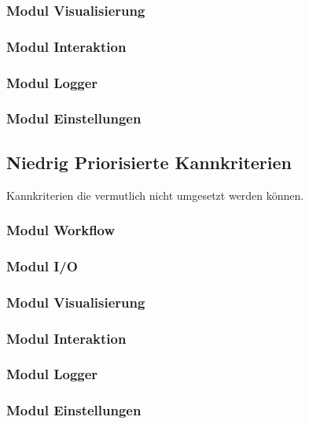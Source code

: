 \subsubsection{Modul Visualisierung}
\subsubsection{Modul Interaktion}
\subsubsection{Modul Logger}
\subsubsection{Modul Einstellungen}

\subsection{Niedrig Priorisierte Kannkriterien}
Kannkriterien die vermutlich nicht umgesetzt werden können.
\subsubsection{Modul Workflow}
\subsubsection{Modul I/O}
\subsubsection{Modul Visualisierung}
\subsubsection{Modul Interaktion}
\subsubsection{Modul Logger}
\subsubsection{Modul Einstellungen}